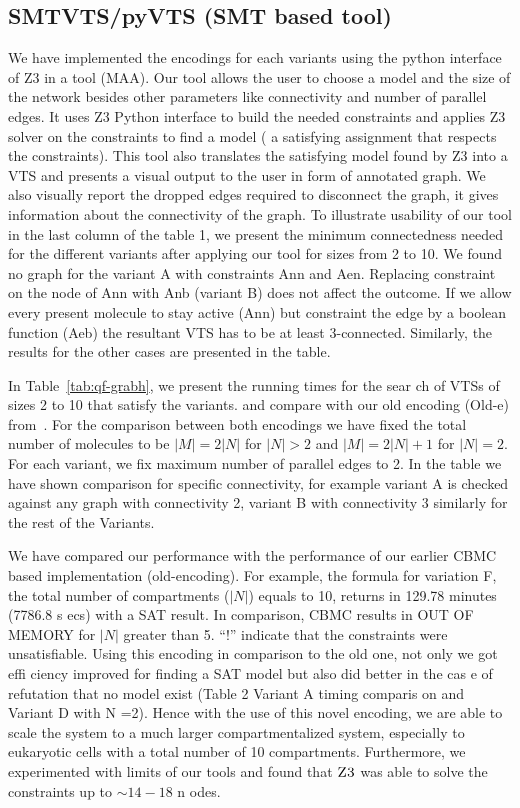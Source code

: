 \subsection{SMTVTS/pyVTS (SMT based tool)}
	We have implemented the encodings for each variants using the python interface of Z3 in a tool (MAA). 
%
Our tool allows the user to choose a model and the size
of the network besides other parameters like connectivity and number of parallel edges. 
%		
It uses Z3 Python interface to build the needed constraints and applies Z3 solver on the constraints to find a model ( a satisfying assignment that respects the constraints). 
%
This tool also translates the satisfying model found by Z3 into
a VTS and presents a visual output to the user in form of annotated graph. 
%
We also visually report the dropped edges required to disconnect the graph, it gives information about the connectivity of the graph.
%
To illustrate usability of our tool in the last column of the table 1, we present the minimum connectedness needed for the different variants after applying our tool for sizes from 2 to 10. 
%
We found no graph for the variant A with constraints Ann and Aen. 
%
Replacing constraint on the node of Ann with Anb (variant B)
does not affect the outcome. 
%
If we allow every present molecule to stay active
(Ann) but constraint the edge by a boolean function (Aeb) the resultant VTS has to be at least 3-connected. 
%
Similarly, the results for the other cases are presented in the table.

In Table~\ref{tab:qf-grabh}, we present the running times for the sear
ch of
VTSs of sizes 2 to 10 that satisfy the variants.
and compare with our old encoding
({Old-e}) from~\cite{shukla}.
%
For the comparison between both encodings we have fixed the total
number of molecules to be $|M| = 2|N|$ for $ |N|> 2$ and
$|M| = 2|N| + 1$ for $|N| = 2$.
%
For each variant, we fix maximum number of parallel
edges to 2.
%
In the table we have shown comparison for specific connectivity, for
example variant A is checked against any graph with connectivity 2,
variant B with connectivity 3 similarly for the rest of the Variants.
%

We have compared our performance with the performance of our earlier
CBMC based implementation (old-encoding).
%
For example, the formula for variation F, the total number of
compartments ($|N|$) equals to 10, returns in 129.78 minutes (7786.8 s
ecs)
with a SAT result.
%
In comparison, CBMC results in OUT OF MEMORY for $|N|$ greater than 5.
%
``!'' indicate that the constraints were unsatisfiable.
%
Using this encoding in comparison to the old one, not only we got effi
ciency improved for finding a SAT model but also did better in the cas
e of refutation that no model exist (Table 2 Variant A timing comparis
on and Variant D with N =2). 
%
Hence with the use of this novel encoding, we are able to scale the system to a much larger compartmentalized system, especially to
eukaryotic cells with a total number of 10 compartments.
%
Furthermore, we experimented with limits of our tools and found
that $\textsc{Z3}$ was able to solve the constraints up to $\sim{14-18}$ n
odes.



